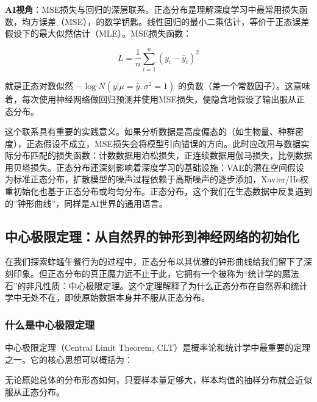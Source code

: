 \documentclass[
  twoside,12pt,fontset=none]{ctexbook}
\renewenvironment{quote}{%
  \def\FrameCommand{{\color{quote-border}\vrule width 4pt}\hspace{10pt}}%
  \MakeFramed {\advance\hsize-\width \FrameRestore\noindent\ignorespaces}%
}{%
  \endMakeFramed
}
\begin{document}
\textbf{AI视角}：MSE损失与回归的深层联系。正态分布是理解深度学习中最常用损失函数，均方误差（MSE），的数学钥匙。线性回归的最小二乘估计，等价于正态误差假设下的最大似然估计（MLE）。MSE损失函数：

\[L = \frac{1}{n}\sum_{i=1}^n (y_i - \hat{y}_i)^2\]

就是正态对数似然 \(-\log N(y|\mu=\hat{y}, \sigma^2=1)\) 的负数（差一个常数因子）。这意味着，每次使用神经网络做回归预测并使用MSE损失，便隐含地假设了输出服从正态分布。

这个联系具有重要的实践意义。如果分析数据是高度偏态的（如生物量、种群密度），正态假设不成立，MSE损失会将模型引向错误的方向。此时应改用与数据实际分布匹配的损失函数：计数数据用泊松损失，正连续数据用伽马损失，比例数据用贝塔损失。正态分布还深刻影响着深度学习的基础设施：VAE的潜在空间假设为标准正态分布，扩散模型的噪声过程依赖于高斯噪声的逐步添加，Xavier/He权重初始化也基于正态分布或均匀分布。正态分布，这个我们在生态数据中反复遇到的''钟形曲线''，同样是AI世界的通用语言。

\hypertarget{ux4e2dux5fc3ux6781ux9650ux5b9aux7406ux4eceux81eaux7136ux754cux7684ux949fux5f62ux5230ux795eux7ecfux7f51ux7edcux7684ux521dux59cbux5316}{%
\subsection{中心极限定理：从自然界的钟形到神经网络的初始化}\label{ux4e2dux5fc3ux6781ux9650ux5b9aux7406ux4eceux81eaux7136ux754cux7684ux949fux5f62ux5230ux795eux7ecfux7f51ux7edcux7684ux521dux59cbux5316}}

在我们探索蚱蜢午餐行为的过程中，正态分布以其优雅的钟形曲线给我们留下了深刻印象。但正态分布的真正魔力远不止于此，它拥有一个被称为``统计学的魔法石''的非凡性质：中心极限定理。这个定理解释了为什么正态分布在自然界和统计学中无处不在，即使原始数据本身并不服从正态分布。

\hypertarget{ux4ec0ux4e48ux662fux4e2dux5fc3ux6781ux9650ux5b9aux7406}{%
\subsubsection{什么是中心极限定理}\label{ux4ec0ux4e48ux662fux4e2dux5fc3ux6781ux9650ux5b9aux7406}}

中心极限定理（Central Limit Theorem, CLT）是概率论和统计学中最重要的定理之一。它的核心思想可以概括为：

\begin{quote}
无论原始总体的分布形态如何，只要样本量足够大，样本均值的抽样分布就会近似服从正态分布。
\end{quote}
\end{document}
